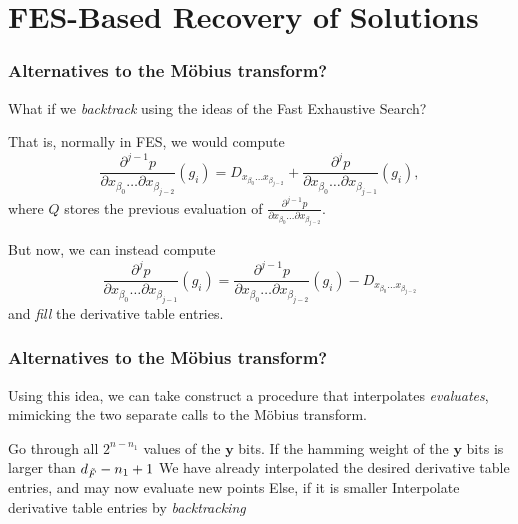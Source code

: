 \documentclass{beamer}
\begin{document}
\section{FES-Based Recovery of Solutions}
\begin{frame}
    \frametitle{Alternatives to the Möbius transform?}

    \pause 

    What if we \textit{backtrack} using the ideas of the Fast Exhaustive Search?

    \pause

    That is, normally in FES, we would compute 
    $$
        \frac{\partial^{j - 1} p}{\partial x_{\beta_0} \dots \partial x_{\beta_{j - 2}}}(g_i) = D_{x_{\beta_0} \dots x_{\beta_{j - 2}}} + \frac{\partial^j p}{\partial x_{\beta_0} \dots \partial x_{\beta_{j - 1}}}(g_i),
    $$
    where $Q$ stores the previous evaluation of $\frac{\partial^{j - 1} p}{\partial x_{\beta_0} \dots \partial x_{\beta_{j - 2}}}$.
    
    \pause

    But now, we can instead compute 
    $$
        \frac{\partial^j p}{\partial x_{\beta_0} \dots \partial x_{\beta_{j - 1}}}(g_i) = \frac{\partial^{j - 1} p}{\partial x_{\beta_0} \dots \partial x_{\beta_{j - 2}}}(g_i) - D_{x_{\beta_0} \dots x_{\beta_{j - 2}}}
    $$
    and \textit{fill} the derivative table entries.
\end{frame}

\begin{frame}
    \frametitle{Alternatives to the Möbius transform?}
    Using this idea, we can take construct a procedure that interpolates \textit{evaluates}, mimicking the two separate calls to the Möbius transform.

    \begin{outline}
        \1 Go through all $2^{n - n_1}$ values of the $\mathbf{y}$ bits.
            \2 If the hamming weight of the $\mathbf{y}$ bits is larger than $d_{\Tilde{F}} - n_1 + 1$
                \3 We have already interpolated the desired derivative table entries, and may now evaluate new points
            \2 Else, if it is smaller
                \3 Interpolate derivative table entries by \textit{backtracking}
    \end{outline}
\end{frame}
\end{document}
